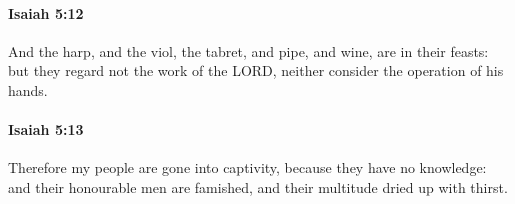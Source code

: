 		\paragraph{Isaiah 5:12} %
			\label{ISAIAH-5-12}

			And the harp, and the viol, the tabret, and pipe, and wine, are in their feasts: but they regard not the work of the LORD, neither consider the operation of his hands.


		\paragraph{Isaiah 5:13} %
			\label{ISAIAH-5-13}

			Therefore my people are gone into captivity, because they have no knowledge: and their honourable men are famished, and their multitude dried up with thirst.


